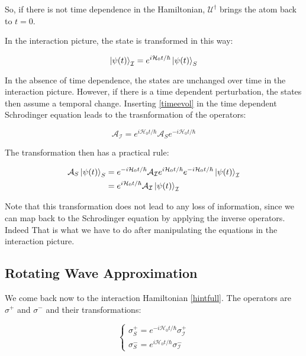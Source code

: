 \documentclass[letterpaper, 12pt]{article}
\begin{document}
So, if there is not time dependence in the Hamiltonian, $\mathcal{U}^{\dagger}$ brings the atom back to $t=0$. 

In the interaction picture, the state is transformed in this way:

\begin{equation} \label{timeevol}
    \ket{\psi(t)}_{\mathcal{I}} = e^{i \mathcal{H}_{0} t / \hbar} \ket{\psi(t)} _{S}
\end{equation}

In the absence of time dependence, the states are unchanged over time in the interaction picture. However, if there is a time dependent perturbation, the states then assume a temporal change. Inserting \ref{timeevol} in the time dependent Schrodinger equation leads to the trasnformation of the operators:

\begin{equation}
    \mathcal{A}_{\mathcal{I}} = e^{i \mathcal{H}_{0} t / \hbar} \mathcal{A}_{S} e^{-i \mathcal{H}_{0} t / \hbar}
\end{equation}

The transformation then has a practical rule:

\begin{equation}
    \begin{split}
        \mathcal{A}_{S} \ket{\psi(t)}_{S} & = e^{-i \mathcal{H}_{0} t / \hbar} \mathcal{A}_{\mathcal{I}} e^{i \mathcal{H}_{0} t / \hbar} e^{-i \mathcal{H}_{0} t / \hbar} \ket{\psi(t)}_{\mathcal{I}} \\
                                    & = e^{i \mathcal{H}_{0} t / \hbar} \mathcal{A}_{\mathcal{I}} \ket{\psi(t)}_{\mathcal{I}}
    \end{split}
\end{equation}

Note that this transformation does not lead to any loss of information, since we can map back to the Schrodinger equation by applying the inverse operators. Indeed That is what we have to do after manipulating
the equations in the interaction picture.

\subsection{Rotating Wave Approximation}

We come back now to the interaction Hamiltonian \ref{hintfull}. The operators are $\sigma^{+}$ and $\sigma^{-}$ and their transformations:

\begin{equation}
\begin{cases}
    \sigma^{+}_{S} = e^{- i \mathcal{H}_{0} t / \hbar} \sigma^{+}_{\mathcal{I}}\\
    \sigma^{-}_{S} = e^{i \mathcal{H}_{0} t / \hbar} \sigma^{-}_{\mathcal{I}}
\end{cases}
\end{equation}
\end{document}
